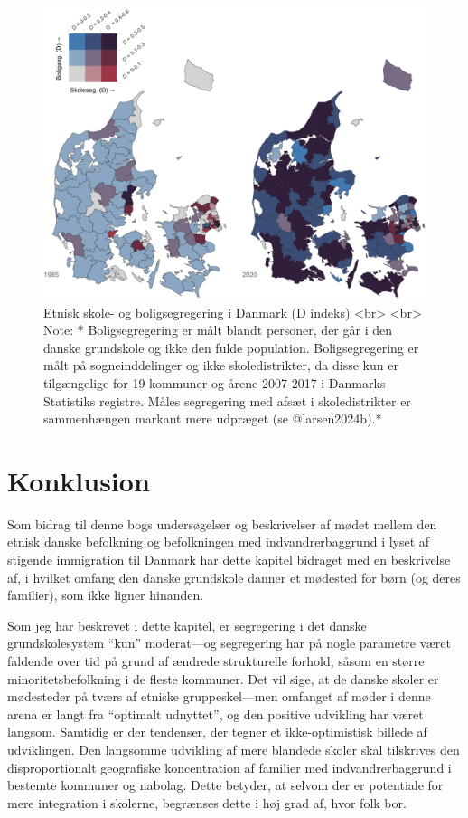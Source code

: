 \documentclass[
]{book}
\begin{document}
\begin{figure}
\includegraphics[width=1\linewidth]{images/Figur5} \caption{Etnisk skole- og boligsegregering i Danmark (D indeks) <br> <br> Note: * Boligsegregering er målt blandt personer, der går i den danske grundskole og ikke den fulde population. Boligsegregering er målt på sogneinddelinger og ikke skoledistrikter, da disse kun er tilgængelige for 19 kommuner og årene 2007-2017 i Danmarks Statistiks registre. Måles segregering med afsæt i skoledistrikter er sammenhængen markant mere udpræget (se @larsen2024b).*}\label{fig:fig-3-4}
\end{figure}

\newpage

\section{Konklusion}\label{konklusion}

Som bidrag til denne bogs undersøgelser og beskrivelser af mødet mellem den etnisk danske befolkning og befolkningen med indvandrerbaggrund i lyset af stigende immigration til Danmark har dette kapitel bidraget med en beskrivelse af, i hvilket omfang den danske grundskole danner et mødested for børn (og deres familier), som ikke ligner hinanden.

Som jeg har beskrevet i dette kapitel, er segregering i det danske grundskolesystem ``kun'' moderat---og segregering har på nogle parametre været faldende over tid på grund af ændrede strukturelle forhold, såsom en større minoritetsbefolkning i de fleste kommuner. Det vil sige, at de danske skoler er mødesteder på tværs af etniske gruppeskel---men omfanget af møder i denne arena er langt fra ``optimalt udnyttet'', og den positive udvikling har været langsom. Samtidig er der tendenser, der tegner et ikke-optimistisk billede af udviklingen. Den langsomme udvikling af mere blandede skoler skal tilskrives den disproportionalt geografiske koncentration af familier med indvandrerbaggrund i bestemte kommuner og nabolag. Dette betyder, at selvom der er potentiale for mere integration i skolerne, begrænses dette i høj grad af, hvor folk bor.
\end{document}

